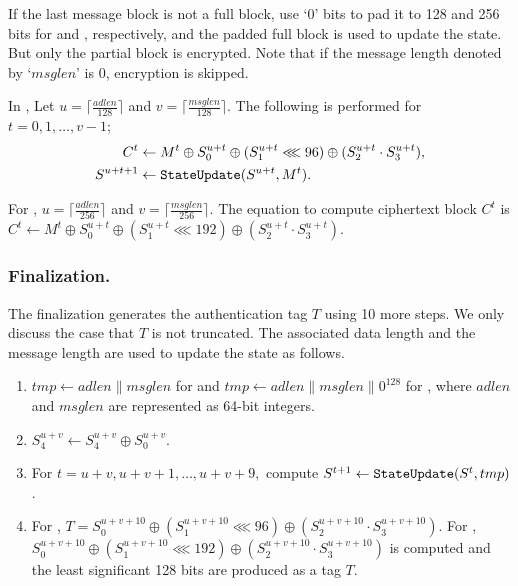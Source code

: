 If the last message block is not a full block, use `0' bits to pad it to 128 and 256 bits for  and , respectively, and the padded full block is used to update the state. But only the partial block is encrypted. Note that if the message length denoted by `$msglen$' is 0, encryption is skipped.

In , Let $u = \lceil \frac{adlen}{128} \rceil$ and $v = \lceil \frac{msglen}{128} \rceil$. The following is performed for $t=0, 1, \ldots, v-1$;
\begin{align*}
C^t &\leftarrow M^t \oplus S^{u+t}_0 \oplus (S^{u+t}_1 \lll 96) \oplus (S^{u+t}_2 \cdot S^{u+t}_3),\\
S^{u+t+1} &\leftarrow {\tt StateUpdate}(S^{u+t},M^t).
\end{align*}

For , $u = \lceil \frac{adlen}{256} \rceil$ and $v = \lceil \frac{msglen}{256} \rceil$. The equation to compute ciphertext block $C^t$ is $C^t \leftarrow M^t \oplus S^{u+t}_0 \oplus (S^{u+t}_1 \lll 192) \oplus (S^{u+t}_2 \cdot S^{u+t}_3)$.

\subsubsection{Finalization.}
The finalization generates the authentication tag $T$ using 10 more steps. We only discuss the case that $T$ is not truncated. The associated data length and the message length are used to update the state as follows.
\begin{enumerate}
\item $tmp \leftarrow adlen\|msglen$ for  and $tmp \leftarrow adlen\|msglen\|0^{128}$ for , where $adlen$ and $msglen$ are represented as 64-bit integers.
\item $S^{u+v}_4 \leftarrow S^{u+v}_4 \oplus S^{u+v}_0.$
\item For $t = u+v, u+v+1, \ldots, u+v+9,$ compute
$S^{t+1} \leftarrow {\tt StateUpdate} (S^t, tmp)$.
\item For , $T = S^{u+v+10}_0 \oplus (S^{u+v+10}_1 \lll 96) \oplus ( S^{u+v+10}_2 \cdot S^{u+v+10}_3)$. For , $S^{u+v+10}_0 \oplus (S^{u+v+10}_1 \lll 192) \oplus ( S^{u+v+10}_2 \cdot S^{u+v+10}_3)$ is computed and the least significant 128 bits are produced as a tag $T$.
\end{enumerate}

